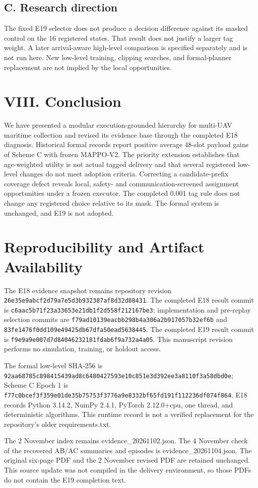 \subsection*{C. Research direction}

The fixed E19 selector does not produce a decision difference against its masked control on the 16 registered states. That result does not justify a larger tag weight. A later arrival-aware high-level comparison is specified separately and is not run here. New low-level training, clipping searches, and formal-planner replacement are not implied by the local opportunities.

\section*{VIII. Conclusion}

We have presented a modular execution-grounded hierarchy for multi-UAV maritime collection and revised its evidence base through the completed E18 diagnosis. Historical formal records report positive average 48-slot payload gains of Scheme C with frozen MAPPO-V2. The priority extension establishes that age-weighted utility is not actual tagged delivery and that several registered low-level changes do not meet adoption criteria. Correcting a candidate-prefix coverage defect reveals local, safety- and communication-screened assignment opportunities under a frozen executor. The completed 0.001 tag rule does not change any registered choice relative to its mask. The formal system is unchanged, and E19 is not adopted.

\section*{Reproducibility and Artifact Availability}

The E18 evidence snapshot remains repository revision \nolinkurl{26e35e9abcf2d79a7e5d3b932387af8d32d88431}. The completed E18 result commit is \nolinkurl{c6aac5b71f23a33653e21db1f2d558f212167be3}; implementation and pre-replay selection commits are \nolinkurl{f79ad10139eacbb298b4a306a2b917057b32ef6b} and \nolinkurl{83fe1476f0dd109e49425db67dfa50ead5638445}. The completed E19 result commit is \nolinkurl{f9e9a9e007d7d84046232181fdab6f9a732a4a05}. This manuscript revision performs no simulation, training, or holdout access.

The formal low-level SHA-256 is \nolinkurl{92aa68785c898415439ad8c6480427593e10c851e3d392ee3a8110f3a58dbd0e}; Scheme C Epoch 1 is \nolinkurl{f77c0bcef3f359e01de35b75753f3776a9e8332bf65fd191f112236df074f864}. E18 records Python 3.14.2, NumPy 2.4.1, PyTorch 2.12.0+cpu, one thread, and deterministic algorithms. This runtime record is not a verified replacement for the repository's older requirements.txt.

The 2 November index remains evidence\_20261102.json. The 4 November check of the recovered AB/AC summaries and episodes is evidence\_20261104.json. The original six-page PDF and the 2 November revised PDF are retained unchanged. This source update was not compiled in the delivery environment, so those PDFs do not contain the E19 completion text.
